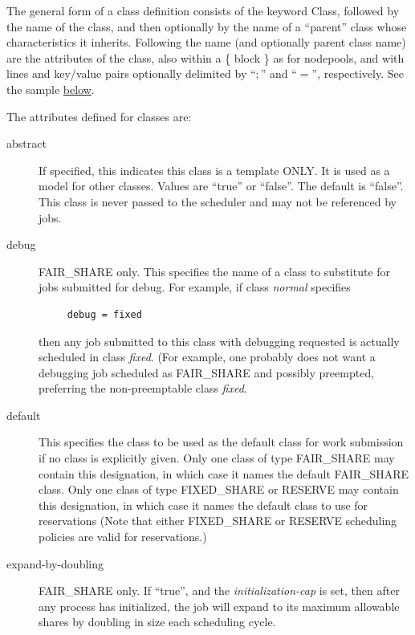     The general form of a class definition consists of the keyword Class, followed
    by the name of the class, and then optionally by the name of a ``parent'' class
    whose characteristics it inherits.   Following the name (and optionally parent class
    name) are the attributes of the class, also within a \{ block \} as for nodepools, and
    with lines and key/value pairs optionally delimited by  ``$;$'' and ``$=$'', respectively.
    See the sample \hyperref[fig:class.configuration]{below}.

    The attributes defined for classes are:
    \begin{description}

      \item[abstract] If specified, this indicates this class is a template ONLY. It is used
        as a model for other classes.  Values are ``true'' or ``false''.  The default is
        ``false''.  This class is never passed to the scheduler and may not be referenced
        by jobs.

      \item[debug] FAIR\_SHARE only. This specifies the name of a class to substitute
        for jobs submitted for debug.  For example, if class {\em normal} specifies
\begin{verbatim}
     debug = fixed
\end{verbatim}
        then any job submitted to this class with debugging requested is actually scheduled
        in class {\em fixed}. (For example, one probably does not want a debugging job
        scheduled as FAIR\_SHARE and possibly preempted, preferring the non-preemptable
        class {\em fixed}.

      \item[default] This specifies the class to be used as the default class for work submission
        if no class is explicitly given.  Only one class of type FAIR\_SHARE may contain this
        designation, in which case it names the default FAIR\_SHARE class.  Only one class of type
        FIXED\_SHARE or RESERVE may contain this designation, in which case it names the default
        class to use for reservations (Note that either FIXED\_SHARE or RESERVE scheduling policies
        are valid for reservations.)

      \item[expand-by-doubling] FAIR\_SHARE only.  If ``true'', and the {\em initialization-cap} is
        set, then after any process has initialized, the job will expand to its maximum allowable
        shares by doubling in size each scheduling cycle.  


\end{description}
